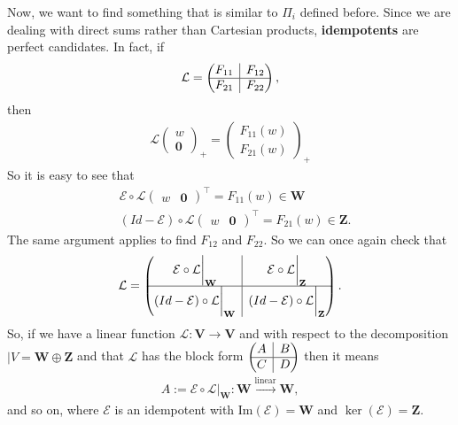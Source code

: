 \documentclass{book}
\theoremstyle{definition}
\newcommand{\V}{\mathbf{V}}
\newcommand{\W}{\mathbf{W}}
\newcommand{\Z}{\mathbf{Z}}
\newcommand{\lag}{\mathcal{L}}
\newcommand{\E}{\mathcal{E}}
\newcommand{\ima}{\text{Im}}
\newcommand{\lin}{\overset{\text{linear}}{\longrightarrow}}
\newcommand{\rvline}{\hspace*{-\arraycolsep}\vline\hspace*{-\arraycolsep}}
\begin{document}
Now, we want to find something that is similar to $\Pi_i$ defined before. Since we are dealing with direct sums rather than Cartesian products, \textbf{idempotents} are perfect candidates. In fact, if 
\begin{align*}
\lag = \begin{pmatrix}
\begin{matrix}
F_{11}
\end{matrix}
& \rvline & F_{12} \\
\hline
F_{21} & \rvline &
F_{22}
\end{pmatrix},
\end{align*}
then 
\begin{align*}
\lag\begin{pmatrix}
w\\ \mathbf{0}
\end{pmatrix}_+ = \begin{pmatrix}
F_{11}(w)\\
F_{21}(w)
\end{pmatrix}_+
\end{align*}
So it is easy to see that
\begin{align*}
&\E \circ \lag \begin{pmatrix}
w & \mathbf{0}
\end{pmatrix}^\top = F_{11}(w) \in \W\\
&(Id - \E) \circ \lag \begin{pmatrix}
w & \mathbf{0}
\end{pmatrix}^\top = F_{21}(w) \in \Z.
\end{align*}
The same argument applies to find $F_{12}$ and $F_{22}$. So we can once again check that 
\begin{align*}
\lag 
=
\begin{pmatrix}
\E \circ \lag\bigg\vert_\W & \rvline & \E\circ\lag\bigg\vert_\Z\\
\hline
(Id - \E) \circ \lag\bigg\vert_\W & \rvline & (Id - \E)\circ \lag \bigg\vert_\Z
\end{pmatrix}.
\end{align*}
So, if we have a linear function $\lag : \V \to \V$ and with respect to the decomposition $|V = \W \oplus \Z$ and that $\lag$ has the block form $\begin{pmatrix}
A & \rvline & B\\
\hline
C & \rvline & D
\end{pmatrix}$ then it means
\begin{align*}
A := \E \circ \lag \bigg\vert_\W : \W \lin \W,
\end{align*}
and so on, where $\E$ is an idempotent with $\ima(\E) = \W$ and $\ker(\E) = \Z$. \\
\end{document}
